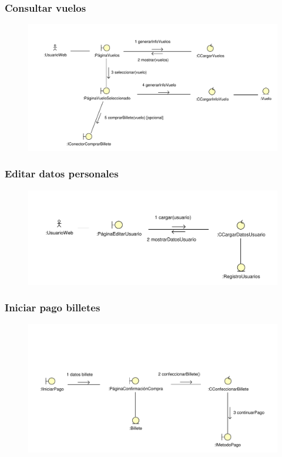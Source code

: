 \documentclass[11pt, a4paper, twoside, titlepage]{article}
\begin{document}
			\subsubsection{Consultar vuelos}
				\begin{figure}[H]\centering
					\includegraphics[scale=.71]{diagramas/consultarvuelos.pdf}
				\end{figure}
			
			\subsubsection{Editar datos personales}
				\begin{figure}[H]\centering
					\includegraphics[scale=.86]{diagramas/editardatospersonales.pdf}
				\end{figure}


			\subsubsection{Iniciar pago billetes}
				\begin{figure}[H]\centering
					\includegraphics[scale=.76]{diagramas/iniciarpagobilletes.pdf}
				\end{figure}
\end{document}
